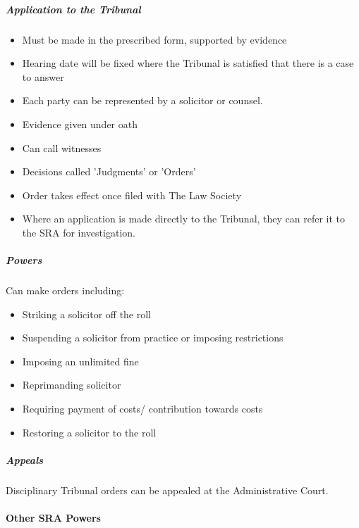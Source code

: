 \documentclass[
]{article}
\providecommand{\tightlist}{%
  \setlength{\itemsep}{0pt}\setlength{\parskip}{0pt}}
\begin{document}
\hypertarget{application-to-the-tribunal}{%
\subparagraph{Application to the
Tribunal}\label{application-to-the-tribunal}}

\begin{itemize}
\tightlist
\item
  Must be made in the prescribed form, supported by evidence
\item
  Hearing date will be fixed where the Tribunal is satisfied that there
  is a case to answer
\item
  Each party can be represented by a solicitor or counsel.
\item
  Evidence given under oath
\item
  Can call witnesses
\item
  Decisions called 'Judgments' or 'Orders'
\item
  Order takes effect once filed with The Law Society
\item
  Where an application is made directly to the Tribunal, they can refer
  it to the SRA for investigation.
\end{itemize}

\hypertarget{powers}{%
\subparagraph{Powers}\label{powers}}

Can make orders including:

\begin{itemize}
\tightlist
\item
  Striking a solicitor off the roll
\item
  Suspending a solicitor from practice or imposing restrictions
\item
  Imposing an unlimited fine
\item
  Reprimanding solicitor
\item
  Requiring payment of costs/ contribution towards costs
\item
  Restoring a solicitor to the roll
\end{itemize}

\hypertarget{appeals}{%
\subparagraph{Appeals}\label{appeals}}

Disciplinary Tribunal orders can be appealed at the Administrative
Court.

\hypertarget{other-sra-powers}{%
\paragraph{Other SRA Powers}\label{other-sra-powers}}
\end{document}
